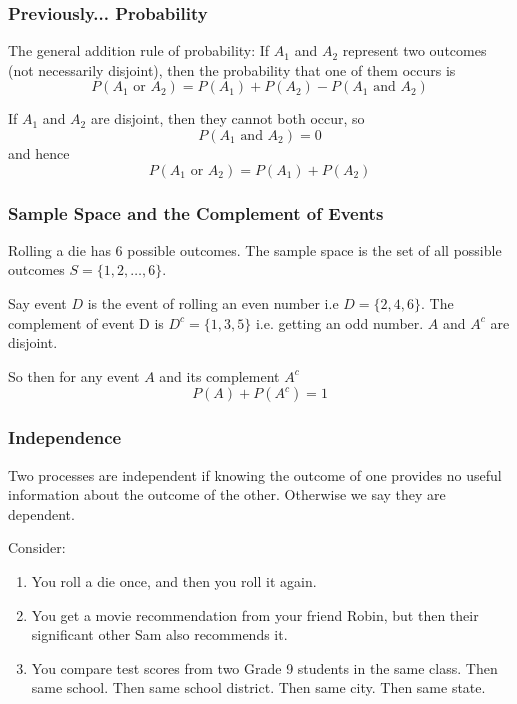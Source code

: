 \documentclass[handout]{beamer}
\newcommand{\blue}[1]{\textcolor{blue2}{#1}}
\begin{document}
\begin{frame}
\frametitle{Previously... Probability}

\blue{The general addition rule of probability}: If $A_1$ and $A_2$ represent two outcomes (not necessarily disjoint), then the probability that one of them occurs is
\[
P(A_1 \mbox{ or } A_2) = P(A_1) + P(A_2) - P(A_1 \mbox{ and } A_2)
\]

\pause If $A_1$ and $A_2$ are disjoint, then they cannot both occur, so 
\[
P(A_1 \mbox{ and } A_2)=0
\]
\pause and hence
\[
P(A_1 \mbox{ or } A_2) = P(A_1) + P(A_2)
\]

\end{frame}


\begin{frame}
\frametitle{Sample Space and the Complement of Events}
Rolling a die has 6 possible outcomes.  The \blue{sample space} is the set of all possible outcomes $S = \{1, 2, \ldots, 6\}$.  

\pause \vspace{0.75cm}
Say event $D$ is the event of rolling an even number i.e $D=\{2, 4, 6\}$.  The \blue{complement of event} D is $D^c=\{1, 3, 5\}$ i.e. getting an odd number.  $A$ and $A^c$ are disjoint.  

\pause \vspace{0.75cm}
So then for any event $A$ and its complement $A^c$
\[
P(A) + P(A^c) = 1
\]

\end{frame}


\begin{frame}
\frametitle{Independence}
Two processes are \blue{independent} if knowing the outcome of one provides no useful information about the outcome of the other.  Otherwise we say they are dependent.

\vspace{0.5cm}

\pause Consider:
\begin{enumerate}
\pause \item You roll a die once, and then you roll it again.
\pause \item You get a movie recommendation from your friend Robin, but then their significant other Sam also recommends it.  
\pause \item You compare test scores from two Grade 9 students in the same class.  Then same school.  Then same school district.  Then same city.  Then same state.
\end{enumerate}

\end{frame}
\end{document}
